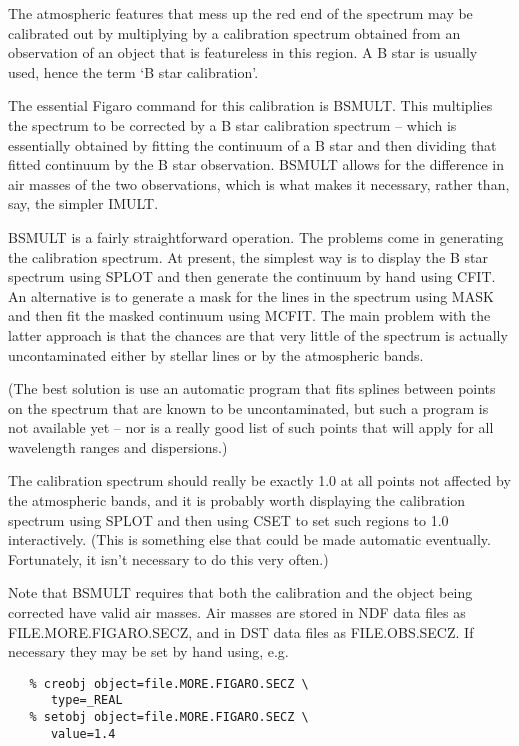 The atmospheric features that mess up the red end of the spectrum may
be calibrated out by multiplying by a calibration spectrum obtained from an
observation of an object that is featureless in this region.  A B star is
usually used, hence the term `B star calibration'.

The essential Figaro command for this calibration is BSMULT.  This
multiplies the spectrum to be corrected by a B star calibration spectrum
-- which is essentially obtained by fitting the continuum of a B star and
then dividing that fitted continuum by the B star observation.  BSMULT
allows for the difference in air masses of the two observations, which is
what makes it necessary, rather than, say, the simpler IMULT.

BSMULT is a fairly straightforward operation.  The problems come in
generating the calibration spectrum.  At present, the simplest way is to
display the B star spectrum using SPLOT and then generate the continuum
by hand using CFIT.  An alternative is to generate a mask for the lines
in the spectrum using MASK and then fit the masked continuum using
MCFIT.  The main problem with the latter approach is that the chances are
that very little of the spectrum is actually uncontaminated either by
stellar lines or by the atmospheric bands.  

(The best solution is use an automatic program that fits
splines between points on the spectrum that are known to be uncontaminated,
but such a program is not available yet -- nor is a really good list of
such points that will apply for all wavelength ranges and dispersions.)

The calibration spectrum should really be exactly 1.0 at all points
not affected by the atmospheric bands, and it is probably worth displaying the
calibration spectrum using SPLOT and then using CSET to set such regions
to 1.0 interactively.  (This is something else that could be made automatic
eventually.  Fortunately, it isn't necessary to do this very often.)

Note that BSMULT requires that both the calibration and the object being
corrected have valid air masses.  Air masses are stored in NDF data
files as FILE.MORE.FIGARO.SECZ, and in DST data files as FILE.OBS.SECZ.
If necessary they may be set by hand using, e.g.

\begin{verbatim}
   % creobj object=file.MORE.FIGARO.SECZ \
      type=_REAL
   % setobj object=file.MORE.FIGARO.SECZ \
      value=1.4
\end{verbatim}

